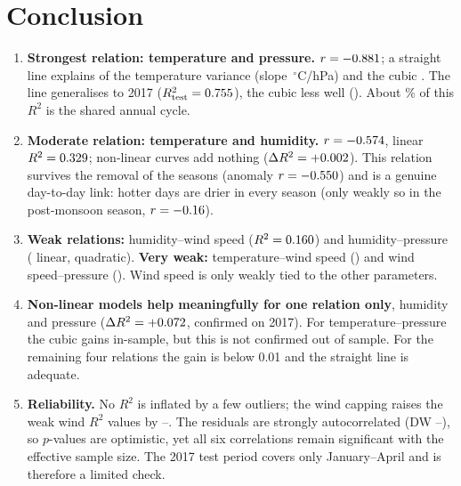 \documentclass[11pt,a4paper]{article}
\newcommand{\Rsq}{R^2}
\begin{document}
\section{Conclusion}
\label{sec:conclusion}

\begin{enumerate}
  \item \textbf{Strongest relation: temperature and pressure.} $r=-0.881$; a straight line
        explains \RlinTP{} of the temperature variance (slope \slopeTP\,$^\circ$C/hPa) and
        the cubic \RbestTP. The line generalises to 2017 ($\Rsq_{\text{test}}=\RlinTestTP$),
        the cubic less well (\RbestTestTP). About \seasShareTP\% of this $\Rsq$ is the
        shared annual cycle.
  \item \textbf{Moderate relation: temperature and humidity.} $r=-0.574$, linear $\Rsq=\RlinTH$;
        non-linear curves add nothing ($\Delta\Rsq=\gainTH$). This relation survives the
        removal of the seasons (anomaly $r=-0.550$) and is a genuine day-to-day link:
        hotter days are drier in every season (only weakly so in the post-monsoon season, $r=-0.16$).
  \item \textbf{Weak relations:} humidity--wind speed ($\Rsq=\RlinHW$) and humidity--pressure
        (\RlinHP{} linear, \RbestHP{} quadratic). \textbf{Very weak:} temperature--wind speed
        (\RlinTW) and wind speed--pressure (\RlinWP). Wind speed is only weakly tied to the
        other parameters.
  \item \textbf{Non-linear models help meaningfully for one relation only}, humidity and
        pressure ($\Delta\Rsq=\gainHP$, confirmed on 2017). For temperature--pressure the cubic gains
        \gainTP{} in-sample, but this is not confirmed out of sample. For the remaining four
        relations the gain is below 0.01 and the straight line is adequate.
  \item \textbf{Reliability.} No $\Rsq$ is inflated by a few outliers; the wind capping
        raises the weak wind $\Rsq$ values by \windCapGainMin--\windCapGainMax. The residuals are strongly
        autocorrelated (DW \DWmin--\DWmax), so $p$-values are optimistic, yet all six
        correlations remain significant with the effective sample size. The 2017 test
        period covers only January--April and is therefore a limited check.
\end{enumerate}

\end{document}
